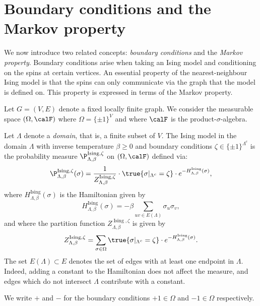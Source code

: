 \section{Boundary conditions and the Markov property}

We now introduce two related concepts:
\emph{boundary conditions} and the \emph{Markov property}.
Boundary conditions arise when taking an Ising model and conditioning
on the spins at certain vertices.
An essential property of the nearest-neighbour Ising model is that the spins
can only communicate via the graph that the model is defined on.
This property is expressed in terms of the Markov property.

\begin{definition}
    \label{def:ising_bc}
    Let $G=(V,E)$ denote a fixed locally finite graph.
    We consider the measurable space 
    $(\Omega,\calF)$ where $\Omega=\{\pm1\}^V$
    and where $\calF$ is the product-$\sigma$-algebra.

    Let $\Lambda$ denote a \emph{domain},
    that is, a finite subset of $V$.
    The Ising model in the domain $\Lambda$
    with inverse temperature $\beta \geq 0$ and boundary conditions
    $\zeta\in\{\pm1\}^{\Lambda^c}$
    is the probability measure $\P_{\Lambda,\beta}^{\operatorname{Ising},\zeta}$
    on $(\Omega,\calF)$ defined via:
    \[
        \P_{\Lambda,\beta}^{\operatorname{Ising},\zeta}(\sigma)
        =
        \frac1{Z_{\Lambda,\beta}^{\operatorname{Ising},\zeta}}
        \cdot
        \true{\sigma|_{\Lambda^c}=\zeta}\cdot e^{-H_{\Lambda,\beta}^{\operatorname{Ising}}(\sigma)}
        ,
    \]
    where $H_{\Lambda,\beta}^{\operatorname{Ising}}(\sigma)$ is the Hamiltonian given by
    \[
        H_{\Lambda,\beta}^{\operatorname{Ising}}(\sigma)
        =
        -\beta\sum_{uv\in E(\Lambda)}\sigma_u\sigma_v
        ,
    \]
    and where the partition function $Z_{\Lambda,\beta}^{\operatorname{Ising},\zeta}$ is given by
    \[
        Z_{\Lambda,\beta}^{\operatorname{Ising},\zeta}
        =
        \sum_{\sigma \in \Omega} \true{\sigma|_{\Lambda^c}=\zeta} \cdot e^{-H_{\Lambda,\beta}^{\operatorname{Ising}}(\sigma)}
        .
    \]
    The set $E(\Lambda)\subset E$ denotes 
    the set of edges with at least one endpoint in $\Lambda$.
    Indeed, adding a constant to the Hamiltonian does not affect the measure,
    and edges which do not intersect $\Lambda$ contribute with a constant.

    We write $+$ and $-$ for the boundary conditions
    $+1\in\Omega$ and $-1\in\Omega$ respectively.
\end{definition}



